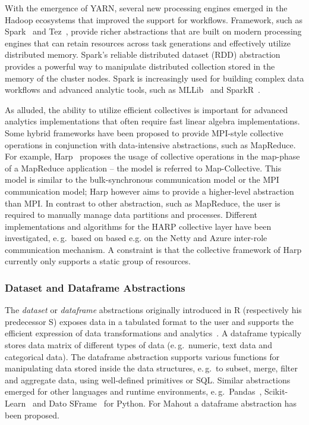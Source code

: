 \documentclass{sig-alternate}
\begin{document}
With the emergence of YARN, several new processing engines emerged in the
Hadoop ecosystems that improved the support for workflows. Framework, such as
Spark~\cite{Zaharia:2010:SCC:1863103.1863113} and Tez~\cite{tez}, provide
richer abstractions that are built on modern processing engines that can retain
resources across task generations and effectively utilize distributed memory.
Spark's reliable distributed dataset (RDD) abstraction provides a powerful way
to manipulate distributed collection stored in the memory of the cluster nodes.
Spark is increasingly used for building complex data workflows and advanced
analytic tools, such as MLLib~\cite{mllib} and SparkR~\cite{spark-r}.

As alluded, the ability to utilize efficient collectives is important for
advanced analytics implementations that often require fast linear algebra
implementations. Some hybrid frameworks have been proposed to provide MPI-style
collective operations in conjunction with data-intensive abstractions, such as
MapReduce. For example, Harp~\cite{harp} proposes the usage of collective
operations in the map-phase of a MapReduce application -- the model is referred
to Map-Collective. This model is similar to the bulk-synchronous communication
model or the MPI communication model; Harp however aims to provide a
higher-level abstraction than MPI. In contrast to other abstraction, such as
MapReduce, the user is required to manually manage data partitions and
processes. Different implementations and algorithms for the HARP collective
layer have been investigated, e.\,g.\ based on based e.g. on the Netty and
Azure inter-role communication mechanism. A constraint is that the collective
framework of Harp currently only supports a static group of resources. 


\subsubsection*{Dataset and Dataframe Abstractions} 

The \emph{dataset} or \emph{dataframe} abstractions originally introduced in R
(respectively his predecessor S) exposes data in a tabulated format to the
user and supports the efficient expression of data transformations and
analytics~\cite{r-lang}. A dataframe typically stores data matrix of different
types of data (e.\,g.\ numeric, text data and categorical data). The dataframe
abstraction supports various functions for manipulating data stored inside the
data structures, e.\,g.\ to subset, merge, filter and aggregate data, using
well-defined primitives or SQL. Similar abstractions emerged for other
languages and runtime environments, e.\,g.\ Pandas~\cite{pandas},
Scikit-Learn~\cite{DBLP:journals/corr/BuitinckLBPMGNPGGLVJHV13} and Dato
SFrame~\cite{sframe} for Python. For Mahout a dataframe abstraction has been
proposed.
\end{document}
